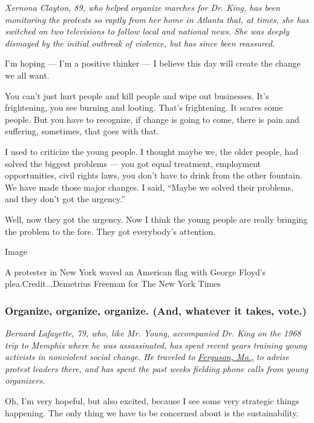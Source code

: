 \emph{Xernona Clayton, 89, who helped organize marches for Dr. King, has
been monitoring the protests so raptly from her home in Atlanta that, at
times, she has switched on two televisions to follow local and national
news. She was deeply dismayed by the initial outbreak of violence, but
has since been reassured.}

I'm hoping --- I'm a positive thinker --- I believe this day will create
the change we all want.

You can't just hurt people and kill people and wipe out businesses. It's
frightening, you see burning and looting. That's frightening. It scares
some people. But you have to recognize, if change is going to come,
there is pain and suffering, sometimes, that goes with that.

I used to criticize the young people. I thought maybe we, the older
people, had solved the biggest problems --- you got equal treatment,
employment opportunities, civil rights laws, you don't have to drink
from the other fountain. We have made those major changes. I said,
``Maybe we solved their problems, and they don't got the urgency.''

Well, now they got the urgency. Now I think the young people are really
bringing the problem to the fore. They got everybody's attention.

Image

A protester in New York waved an American flag with George Floyd's
plea.Credit...Demetrius Freeman for The New York Times

\hypertarget{organize-organize-organize-and-whatever-it-takes-vote}{%
\subsubsection{Organize, organize, organize. (And, whatever it takes,
vote.)}\label{organize-organize-organize-and-whatever-it-takes-vote}}

\emph{Bernard Lafayette, 79, who, like Mr. Young, accompanied Dr. King
on the 1968 trip to Memphis where he was assassinated, has spent recent
years training young activists in nonviolent social change. He traveled
to}
\href{https://www.nytimes.com/interactive/2014/08/13/us/ferguson-missouri-town-under-siege-after-police-shooting.html}{\emph{Ferguson,
Mo.,}} \emph{to advise protest leaders there, and has spent the past
weeks fielding phone calls from young organizers.}

Oh, I'm very hopeful, but also excited, because I see some very
strategic things happening. The only thing we have to be concerned about
is the sustainability.

